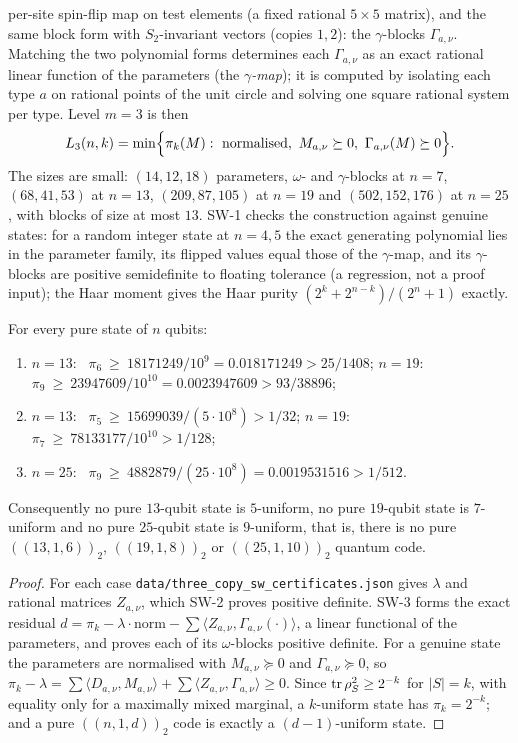 per-site spin-flip map on test elements (a fixed rational $5\times5$ matrix), and the same block form
with $S_2$-invariant vectors (copies $1,2$): the $\gamma$-blocks $\Gamma_{a,\nu}$. Matching the two
polynomial forms determines each $\Gamma_{a,\nu}$ as an exact rational linear function of the parameters
(the \emph{$\gamma$-map}); it is computed by isolating each type $a$ on rational points of the unit
circle and solving one square rational system per type. Level $m=3$ is then
\[
 L_3(n,k)=\min\Bigl\{\pi_k(M):\ \text{normalised},\ M_{a,\nu}\succeq0,\ \Gamma_{a,\nu}(M)\succeq0\Bigr\}.
\]
The sizes are small: $(14,12,18)$ parameters, $\omega$- and $\gamma$-blocks at $n=7$, $(68,41,53)$
at $n=13$, $(209,87,105)$ at $n=19$ and $(502,152,176)$ at $n=25$, with blocks of size at most $13$.
SW-1 checks the construction against genuine states: for a random integer state at $n=4,5$ the exact
generating polynomial lies in the parameter family, its flipped values equal those of the $\gamma$-map, and
its $\gamma$-blocks are positive semidefinite to floating tolerance (a regression, not a proof input); the Haar moment gives the Haar purity $(2^k+2^{n-k})/(2^n+1)$ exactly.

\begin{theorem}\label{thm:threecopy-sw}
For every pure state of $n$ qubits:
\begin{enumerate}
  \item[(a)] $n=13$: \ $\pi_6\ \ge\ 18171249/10^9=0.018171249>25/1408$; \quad
             $n=19$: \ $\pi_9\ \ge\ 23947609/10^{10}=0.0023947609>93/38896$;
  \item[(b)] $n=13$: \ $\pi_5\ \ge\ 15699039/(5\cdot10^8)>1/32$; \quad
             $n=19$: \ $\pi_7\ \ge\ 78133177/10^{10}>1/128$;
  \item[(c)] $n=25$: \ $\pi_9\ \ge\ 4882879/(25\cdot10^8)=0.0019531516>1/512$.
\end{enumerate}
Consequently no pure $13$-qubit state is $5$-uniform, no pure $19$-qubit state is $7$-uniform and no
pure $25$-qubit state is $9$-uniform, that is, there is no pure $((13,1,6))_2$, $((19,1,8))_2$ or
$((25,1,10))_2$ quantum code.
\end{theorem}

\begin{proof}
For each case \texttt{data/three\_copy\_sw\_certificates.json} gives $\lambda$ and rational matrices
$Z_{a,\nu}$, which SW-2 proves positive definite. SW-3 forms the exact residual
$d=\pi_k-\lambda\cdot\mathrm{norm}-\sum\langle Z_{a,\nu},\Gamma_{a,\nu}(\cdot)\rangle$, a linear functional
of the parameters, and proves each of its $\omega$-blocks positive definite. For a genuine state the
parameters are normalised with $M_{a,\nu}\succeq0$ and $\Gamma_{a,\nu}\succeq0$, so
$\pi_k-\lambda=\sum\langle D_{a,\nu},M_{a,\nu}\rangle+\sum\langle Z_{a,\nu},\Gamma_{a,\nu}\rangle\ge0$.
Since $\operatorname{tr}\rho_S^2\ge2^{-k}$ for $|S|=k$, with equality only for a maximally mixed marginal, a
$k$-uniform state has $\pi_k=2^{-k}$; and a pure $((n,1,d))_2$ code is exactly a $(d-1)$-uniform
state. \qedhere
\end{proof}

